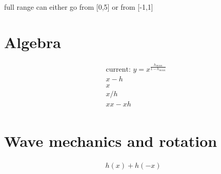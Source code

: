 \documentclass{article}
\begin{document}
	
	full range can either go from [0,5] or from [-1,1]
	
	\section{Algebra}
	\begin{align}
		&\text{current:   }y = x^{\frac{h_{mean}}{1-h_{mean}}}\\
		&x-h\\
		&x\\
		&x/h\\
		&xx-xh\\
	\end{align}
	
	\section{Wave mechanics and rotation}
	\begin{align}
		h(x)+h(-x)
	\end{align}
	
	
	
\end{document}
